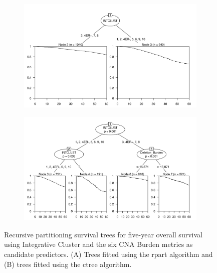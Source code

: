 \begin{figure}[!htb]
\centering

\vspace{0.5cm}

\begin{subfigure}{\textwidth}
\subcaption{}
\includegraphics[width=1\textwidth]{../figures/Appendices/Appendix_B/PartyKit_Survival_Burden_FiveYearOS_INTCLUST.png}
\end{subfigure}

\vspace{2cm}

\begin{subfigure}{\textwidth}
\subcaption{}
\includegraphics[width=1\textwidth]{../figures/Appendices/Appendix_B/Ctree_Survival_Burden_FiveYearOS_INTCLUST.png}
\end{subfigure}

\vspace{0.5cm}

\caption[Recursive partitioning survival trees for five-year overall survival using Integrative Cluster and the six CNA Burden metrics as candidate predictors.]{Recursive partitioning survival trees for five-year overall survival using Integrative Cluster and the six CNA Burden metrics as candidate predictors. (A) Trees fitted using the rpart algorithm and (B) trees fitted using the ctree algorithm.}
\end{figure}

